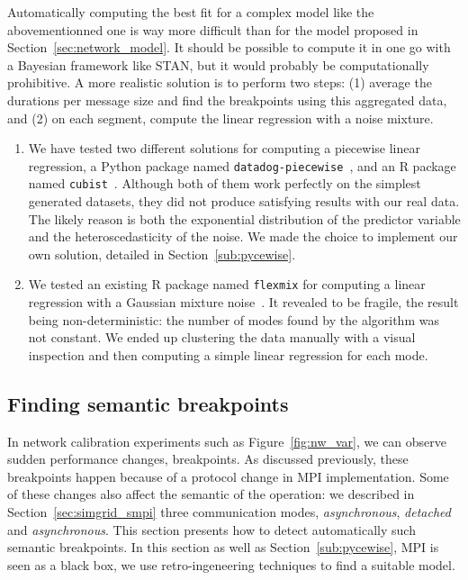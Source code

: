             Automatically computing the best fit for a complex model like the abovementionned one is way more difficult
            than for the \dgemm model proposed in Section~\ref{sec:network_model}. It should be possible to compute it
            in one go with a Bayesian framework like STAN, but it would probably be computationally prohibitive. A more
            realistic solution is to perform two steps: (1) average the durations per message size and find the
            breakpoints using this aggregated data, and (2) on each segment, compute the linear regression with a noise
            mixture.
            \begin{enumerate}
                \item We have tested two different solutions for computing a piecewise linear regression, a Python
                    package named \texttt{datadog-piecewise}~\cite{datadog}, and an R package named
                    \texttt{cubist}~\cite{cubist}.  Although both of them work perfectly on the simplest generated
                    datasets, they did not produce satisfying results with our real data. The likely reason is both the
                    exponential distribution of the predictor variable and the heteroscedasticity of the noise. We made
                    the choice  to implement our own solution, detailed in Section~\ref{sub:pycewise}.
                \item We tested an existing R package named \texttt{flexmix} for computing a linear regression with a
                    Gaussian mixture noise~\cite{flexmix}. It revealed to be fragile, the result being
                    non-deterministic: the number of modes found by the algorithm was not constant. We ended up
                    clustering the data manually with a visual inspection and then computing a simple linear regression
                    for each mode.
            \end{enumerate}

        \subsection{Finding semantic breakpoints}%
        \label{sub:finding_semantic_breakpoints}

            In network calibration experiments such as Figure~\ref{fig:nw_var}, we can observe sudden performance
            changes, \aka breakpoints. As discussed previously, these breakpoints happen because of a protocol change in
            MPI implementation. Some of these changes also affect the semantic of the \send operation: we described in
            Section~\ref{sec:simgrid_smpi} three communication modes, \emph{asynchronous}, \emph{detached} and
            \emph{asynchronous}. This section presents how to detect automatically such semantic breakpoints.  In this
            section as well as Section~\ref{sub:pycewise}, MPI is seen as a black box, we use retro-ingeneering
            techniques to find a suitable model.

